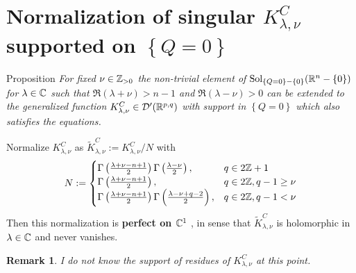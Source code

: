 \documentclass[8pt,pdf,notes]{beamer}
\newcommand{\Sol}{\mbox{Sol}}
\newcommand{\D}{\mathcal{D}}
\newenvironment{prop}{\begin{exampleblock}{Proposition}\it}{\end{exampleblock}}
\theoremstyle{mystyle}
\newtheorem*{remark}{Remark}
\begin{document}
\section{Normalization of singular ${K}^C_{ \lambda,\nu }$ supported on $\left\{ Q=0 \right\}$}
\begin{frame}
\begin{prop}
	For fixed $\nu\in\mathbb{Z}_{ >0 }$
	the non-trivial element of $\Sol_{\mycbra{Q=0}-\mycbra{0}}(\R^n-\mycbra{0})$ for $\lambda\in\mathbb{C}$ such that 
	$\Re(\lambda+\nu)>n-1$ and $\Re(\lambda-\nu)>0$ can be extended to the generalized function 
	$K_{\lambda,\nu}^C\in\D'(\R^{p,q})$ with support in $\left\{ Q=0 \right\}$ which also satisfies the equations.
\end{prop}
\begin{theorem}[$O(p+1,q+1),\;n:=p+q$]
	Normalize $K^C_{ \lambda,\nu }$ as $\tilde{K}^C_{\lambda,\nu}:=K^C_{\lambda,\nu}/N$ with\[
		N:=\begin{cases}
		\Gamma\left( \frac{\lambda+\nu-n+1}{2} \right)\Gamma\left( \frac{\lambda-\nu}{2} \right),&q\in2\mathbb{Z}+1\\
		\Gamma\left( \frac{\lambda+\nu-n+1}{2} \right),&q\in2\mathbb{Z},q-1\ge\nu\\
		\Gamma\left( \frac{\lambda+\nu-n+1}{2} \right)\Gamma\left( \frac{\lambda-\nu+q-2}{2} \right),&q\in2\mathbb{Z},q-1<\nu\\
		\end{cases}
	\]
	Then this normalization is {\bf perfect on $\mathbb{C}^1$}
	, in sense that $\tilde{K}_{\lambda,\nu}^C$ is holomorphic in $\lambda\in\mathbb{C}$ and
	never vanishes.
\end{theorem}
\begin{remark}
	I do not know the support of residues of $K^C_{\lambda,\nu}$ at this point.
\end{remark}
\end{frame}
\end{document}
